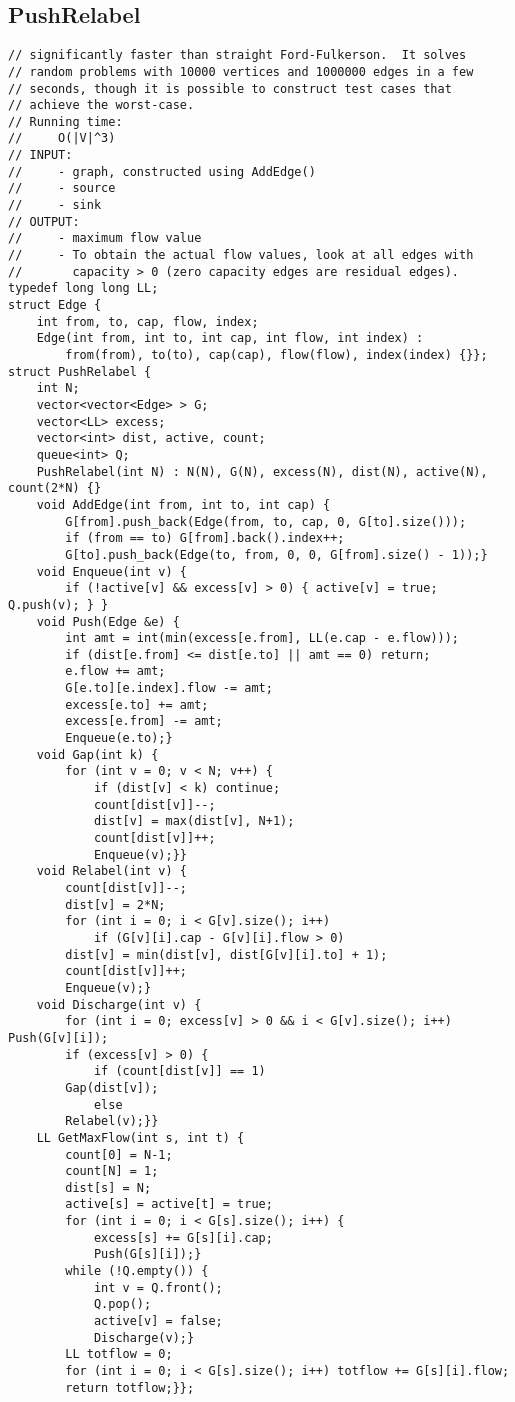 \documentclass[8pt, oneside]{extarticle}
\begin{document}
\begin{multicols}{3}
\subsection{PushRelabel}
\begin{lstlisting}
// significantly faster than straight Ford-Fulkerson.  It solves
// random problems with 10000 vertices and 1000000 edges in a few
// seconds, though it is possible to construct test cases that
// achieve the worst-case.
// Running time:
//     O(|V|^3)
// INPUT: 
//     - graph, constructed using AddEdge()
//     - source
//     - sink
// OUTPUT:
//     - maximum flow value
//     - To obtain the actual flow values, look at all edges with
//       capacity > 0 (zero capacity edges are residual edges).
typedef long long LL;
struct Edge {
    int from, to, cap, flow, index;
    Edge(int from, int to, int cap, int flow, int index) :
        from(from), to(to), cap(cap), flow(flow), index(index) {}};
struct PushRelabel {
    int N;
    vector<vector<Edge> > G;
    vector<LL> excess;
    vector<int> dist, active, count;
    queue<int> Q;
    PushRelabel(int N) : N(N), G(N), excess(N), dist(N), active(N), count(2*N) {}
    void AddEdge(int from, int to, int cap) {
        G[from].push_back(Edge(from, to, cap, 0, G[to].size()));
        if (from == to) G[from].back().index++;
        G[to].push_back(Edge(to, from, 0, 0, G[from].size() - 1));}
    void Enqueue(int v) { 
        if (!active[v] && excess[v] > 0) { active[v] = true; Q.push(v); } }
    void Push(Edge &e) {
        int amt = int(min(excess[e.from], LL(e.cap - e.flow)));
        if (dist[e.from] <= dist[e.to] || amt == 0) return;
        e.flow += amt;
        G[e.to][e.index].flow -= amt;
        excess[e.to] += amt;    
        excess[e.from] -= amt;
        Enqueue(e.to);}
    void Gap(int k) {
        for (int v = 0; v < N; v++) {
            if (dist[v] < k) continue;
            count[dist[v]]--;
            dist[v] = max(dist[v], N+1);
            count[dist[v]]++;
            Enqueue(v);}}
    void Relabel(int v) {
        count[dist[v]]--;
        dist[v] = 2*N;
        for (int i = 0; i < G[v].size(); i++) 
            if (G[v][i].cap - G[v][i].flow > 0)
        dist[v] = min(dist[v], dist[G[v][i].to] + 1);
        count[dist[v]]++;
        Enqueue(v);}
    void Discharge(int v) {
        for (int i = 0; excess[v] > 0 && i < G[v].size(); i++) Push(G[v][i]);
        if (excess[v] > 0) {
            if (count[dist[v]] == 1) 
        Gap(dist[v]); 
            else
        Relabel(v);}}
    LL GetMaxFlow(int s, int t) {
        count[0] = N-1;
        count[N] = 1;
        dist[s] = N;
        active[s] = active[t] = true;
        for (int i = 0; i < G[s].size(); i++) {
            excess[s] += G[s][i].cap;
            Push(G[s][i]);}
        while (!Q.empty()) {
            int v = Q.front();
            Q.pop();
            active[v] = false;
            Discharge(v);}
        LL totflow = 0;
        for (int i = 0; i < G[s].size(); i++) totflow += G[s][i].flow;
        return totflow;}};
\end{lstlisting}

\end{multicols}
\end{document}

